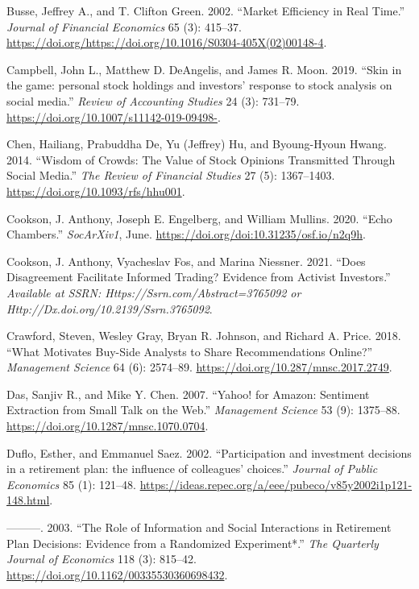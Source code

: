 \documentclass[12pt,]{article}
\begin{document}
\leavevmode\hypertarget{ref-busse2002}{}%
Busse, Jeffrey A., and T. Clifton Green. 2002. ``Market Efficiency in
Real Time.'' \emph{Journal of Financial Economics} 65 (3): 415--37.
\url{https://doi.org/https://doi.org/10.1016/S0304-405X(02)00148-4}.

\leavevmode\hypertarget{ref-campbell2019}{}%
Campbell, John L., Matthew D. DeAngelis, and James R. Moon. 2019. ``Skin
in the game: personal stock holdings and investors' response to stock
analysis on social media.'' \emph{Review of Accounting Studies} 24 (3):
731--79. \url{https://doi.org/10.1007/s11142-019-09498-}.

\leavevmode\hypertarget{ref-chen2014}{}%
Chen, Hailiang, Prabuddha De, Yu (Jeffrey) Hu, and Byoung-Hyoun Hwang.
2014. ``Wisdom of Crowds: The Value of Stock Opinions Transmitted
Through Social Media.'' \emph{The Review of Financial Studies} 27 (5):
1367--1403. \url{https://doi.org/10.1093/rfs/hhu001}.

\leavevmode\hypertarget{ref-cookson2020}{}%
Cookson, J. Anthony, Joseph E. Engelberg, and William Mullins. 2020.
``Echo Chambers.'' \emph{SocArXiv1}, June.
\url{https://doi.org/doi:10.31235/osf.io/n2q9h}.

\leavevmode\hypertarget{ref-cookson2021}{}%
Cookson, J. Anthony, Vyacheslav Fos, and Marina Niessner. 2021. ``Does
Disagreement Facilitate Informed Trading? Evidence from Activist
Investors.'' \emph{Available at SSRN: Https://Ssrn.com/Abstract=3765092
or Http://Dx.doi.org/10.2139/Ssrn.3765092}.

\leavevmode\hypertarget{ref-crawford2018}{}%
Crawford, Steven, Wesley Gray, Bryan R. Johnson, and Richard A. Price.
2018. ``What Motivates Buy-Side Analysts to Share Recommendations
Online?'' \emph{Management Science} 64 (6): 2574--89.
\url{https://doi.org/10.287/mnsc.2017.2749}.

\leavevmode\hypertarget{ref-das2007}{}%
Das, Sanjiv R., and Mike Y. Chen. 2007. ``Yahoo! for Amazon: Sentiment
Extraction from Small Talk on the Web.'' \emph{Management Science} 53
(9): 1375--88. \url{https://doi.org/10.1287/mnsc.1070.0704}.

\leavevmode\hypertarget{ref-duflo2002}{}%
Duflo, Esther, and Emmanuel Saez. 2002. ``Participation and investment
decisions in a retirement plan: the influence of colleagues' choices.''
\emph{Journal of Public Economics} 85 (1): 121--48.
\url{https://ideas.repec.org/a/eee/pubeco/v85y2002i1p121-148.html}.

\leavevmode\hypertarget{ref-duflo2003}{}%
---------. 2003. ``The Role of Information and Social Interactions in
Retirement Plan Decisions: Evidence from a Randomized Experiment*.''
\emph{The Quarterly Journal of Economics} 118 (3): 815--42.
\url{https://doi.org/10.1162/00335530360698432}.
\end{document}
